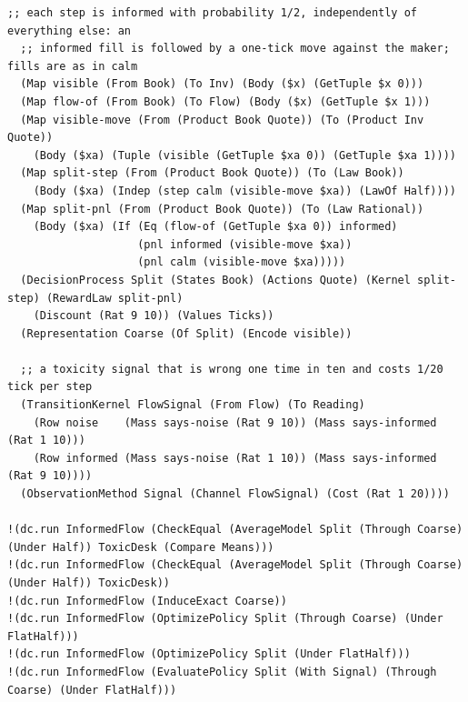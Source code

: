 \documentclass[11pt]{article}
\theoremstyle{definition}
\theoremstyle{plain}
\begin{document}
\begin{lstlisting}[style=mettafull]
  ;; each step is informed with probability 1/2, independently of everything else: an
  ;; informed fill is followed by a one-tick move against the maker; fills are as in calm
  (Map visible (From Book) (To Inv) (Body ($x) (GetTuple $x 0)))
  (Map flow-of (From Book) (To Flow) (Body ($x) (GetTuple $x 1)))
  (Map visible-move (From (Product Book Quote)) (To (Product Inv Quote))
    (Body ($xa) (Tuple (visible (GetTuple $xa 0)) (GetTuple $xa 1))))
  (Map split-step (From (Product Book Quote)) (To (Law Book))
    (Body ($xa) (Indep (step calm (visible-move $xa)) (LawOf Half))))
  (Map split-pnl (From (Product Book Quote)) (To (Law Rational))
    (Body ($xa) (If (Eq (flow-of (GetTuple $xa 0)) informed)
                    (pnl informed (visible-move $xa))
                    (pnl calm (visible-move $xa)))))
  (DecisionProcess Split (States Book) (Actions Quote) (Kernel split-step) (RewardLaw split-pnl)
    (Discount (Rat 9 10)) (Values Ticks))
  (Representation Coarse (Of Split) (Encode visible))

  ;; a toxicity signal that is wrong one time in ten and costs 1/20 tick per step
  (TransitionKernel FlowSignal (From Flow) (To Reading)
    (Row noise    (Mass says-noise (Rat 9 10)) (Mass says-informed (Rat 1 10)))
    (Row informed (Mass says-noise (Rat 1 10)) (Mass says-informed (Rat 9 10))))
  (ObservationMethod Signal (Channel FlowSignal) (Cost (Rat 1 20))))

!(dc.run InformedFlow (CheckEqual (AverageModel Split (Through Coarse) (Under Half)) ToxicDesk (Compare Means)))
!(dc.run InformedFlow (CheckEqual (AverageModel Split (Through Coarse) (Under Half)) ToxicDesk))
!(dc.run InformedFlow (InduceExact Coarse))
!(dc.run InformedFlow (OptimizePolicy Split (Through Coarse) (Under FlatHalf)))
!(dc.run InformedFlow (OptimizePolicy Split (Under FlatHalf)))
!(dc.run InformedFlow (EvaluatePolicy Split (With Signal) (Through Coarse) (Under FlatHalf)))


\end{lstlisting}
\end{document}
